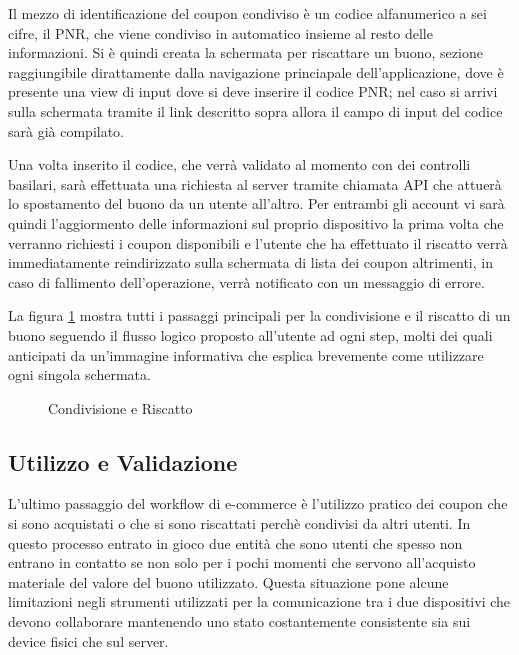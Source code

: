 Il mezzo di identificazione del coupon condiviso è un codice alfanumerico
a sei cifre, il PNR, che viene condiviso in automatico insieme al
resto delle informazioni. Si è quindi creata la schermata per riscattare
un buono, sezione raggiungibile dirattamente dalla navigazione princiapale
dell'applicazione, dove è presente una view di input dove si deve
inserire il codice PNR; nel caso si arrivi sulla schermata tramite
il link descritto sopra allora il campo di input del codice sarà già
compilato.

Una volta inserito il codice, che verrà validato al momento con dei
controlli basilari, sarà effettuata una richiesta al server tramite
chiamata API che attuerà lo spostamento del buono da un utente all'altro.
Per entrambi gli account vi sarà quindi l'aggiormento delle informazioni
sul proprio dispositivo la prima volta che verranno richiesti i coupon
disponibili e l'utente che ha effettuato il riscatto verrà immediatamente
reindirizzato sulla schermata di lista dei coupon altrimenti, in caso
di fallimento dell'operazione, verrà notificato con un messaggio di
errore. 

La figura \ref{fig:Condivisione-e-Riscatto} mostra tutti i passaggi
principali per la condivisione e il riscatto di un buono seguendo
il flusso logico proposto all'utente ad ogni step, molti dei quali
anticipati da un'immagine informativa che esplica brevemente come
utilizzare ogni singola schermata.

\begin{figure}

\caption{\label{fig:Condivisione-e-Riscatto}Condivisione e Riscatto}

\end{figure}


\subsection{Utilizzo e Validazione}

L'ultimo passaggio del workflow di e-commerce è l'utilizzo pratico
dei coupon che si sono acquistati o che si sono riscattati perchè
condivisi da altri utenti. In questo processo entrato in gioco due
entità che sono utenti che spesso non entrano in contatto se non solo
per i pochi momenti che servono all'acquisto materiale del valore
del buono utilizzato. Questa situazione pone alcune limitazioni negli
strumenti utilizzati per la comunicazione tra i due dispositivi che
devono collaborare mantenendo uno stato costantemente consistente
sia sui device fisici che sul server.

